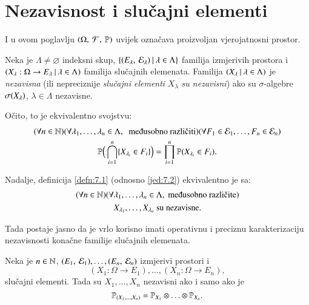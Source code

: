 
\chapter{Nezavisnost i slu\v cajni elementi}

I u ovom poglavlju $(\Omega, \: \mathcal{F}, \: \mathbb{P})$ uvijek ozna\v cava proizvoljan vjerojatnosni prostor.

\begin{defn}   \label{defn:7.1}
    Neka je $\Lambda \neq \varnothing$ indeksni skup, $\{{({E_\lambda}, \: {\mathcal{E}_\lambda})} \: | \: {\lambda \in \Lambda}\}$ familija izmjerivih prostora i $({X_\lambda : \Omega \to E_\lambda} \: | \: {\lambda \in \Lambda})$ familija slu\v cajnih elemenata.
    Familija $({X_\lambda} \: | \: {\lambda \in \Lambda})$ je \emph{nezavisna} (ili nepreciznije \emph{slu\v cajni elementi} $X_\lambda$ \emph{su nezavisni}) ako su $\sigma$-algebre $\sigma({X_\lambda})$, $\lambda \in \Lambda$ nezavisne.
\end{defn}

O\v cito, to je ekvivalentno svojstvu:
\begin{equation}    \label{jed:7.2}
    \begin{gathered}
        (\forall n \in \nat) (\forall \lambda_1, \ldots, \lambda_n \in \Lambda, \; \textnormal{ me\dj usobno razli\v citi}) (\forall F_1 \in \famE_1, \ldots, F_n \in \famE_n)\\ 
        \masP \Big( \presjek{i = 1}{n} \{ X_{\lambda_i} \in F_i \} \Big) = \produkt{i = 1}{n} \vjeroj{X_{\lambda_i} \in F_i}.
    \end{gathered}
\end{equation}

Nadalje, definicija \ref{defn:7.1} (odnosno \eqref{jed:7.2}) ekvivalentno je sa:
\begin{equation}    \label{jed:7.3}
    \begin{gathered}
        (\forall n \in \nat) (\forall \lambda_1, \ldots, \lambda_n \in \Lambda, \textnormal{ me\dj usobno razli\v cite})\\
        X_{\lambda_1}, \ldots, X_{\lambda_n} \textnormal{ su nezavisne}.
    \end{gathered}
\end{equation}

Tada postaje jasno da je vrlo korisno imati operativnu i preciznu karakterizaciju nezavisnosti kona\v cne familije slu\v cajnih elemenata.

\begin{tm}  \label{tm:7.4}
    Neka je $n \in \mathbb{N}$, $({E_1}, \: {\mathcal{E}_1}), \ldots, ({E_n}, \: {\mathcal{E}_n})$ izmjerivi prostori i
    \begin{equation*}
        (X_1 : \Omega \to E_1), \ldots, (X_n : \Omega \to E_n),    
    \end{equation*}
    slu\v cajni elementi.
    Tada su $X_1, \ldots, X_n$ nezavisni ako i samo ako je
    \begin{equation*}
        \mathbb{P}_{({X}_1, \ldots, {X}_n)} = \mathbb{P}_{X_1} \otimes \ldots \otimes \mathbb{P}_{X_n}.
    \end{equation*}
\end{tm}

